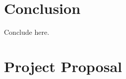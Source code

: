 \documentclass[12pt,twoside,notitlepage]{report}
\begin{document}
\cleardoublepage
\chapter{Conclusion}

Conclude here.




\cleardoublepage



\cleardoublepage

\appendix

\chapter{Project Proposal}


\end{document}
